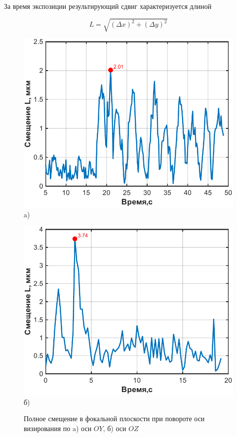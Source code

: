 За время экспозиции результирующий сдвиг характеризуется длиной

\begin{equation}
	\label{eq:biasL}
	L=\sqrt{(\Delta x)^2+(\Delta y)^2}
\end{equation}

\begin{figure}[!h]
	\begin{minipage}[b][][b]{0.49\linewidth}\centering
		\includegraphics[width=1\linewidth]{matlab/img/LmaxY.pdf} \\ a)
	\end{minipage}
	\hfill
	\begin{minipage}[b][][b]{0.49\linewidth}\centering
		\includegraphics[width=1\linewidth]{matlab/img/LmaxZ.pdf} \\ б)
	\end{minipage}
	\caption{Полное смещение в фокальной плоскости при повороте оси визирования по a) оси $OY$, б) оси $OZ$ }
	\label{fig:biasL}
\end{figure}

